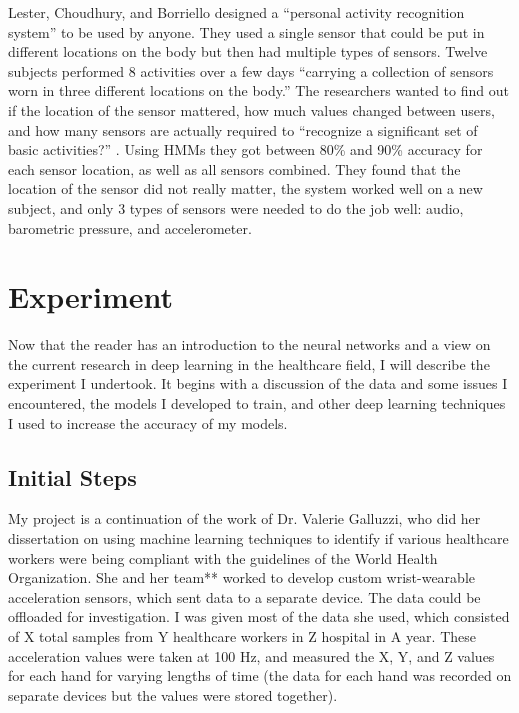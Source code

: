 \documentclass[]{report}
\begin{document}
Lester, Choudhury, and Borriello designed a “personal activity recognition system” to be used by anyone. They used a single sensor that could be put in different locations on the body but then had multiple types of sensors. Twelve subjects performed 8 activities over a few days “carrying a collection of sensors worn in three different locations on the body.” The researchers wanted to find out if the location of the sensor mattered, how much values changed between users, and how many sensors are actually required to “recognize a significant set of basic activities?” \cite{Lester2006}.
Using HMMs they got between 80\% and 90\% accuracy for each sensor location, as well as all sensors combined. They found that the location of the sensor did not really matter, the system worked well on a new subject, and only 3 types of sensors were needed to do the job well: audio, barometric pressure, and accelerometer.


\chapter{Experiment}

Now that the reader has an introduction to the neural networks and a view on the current research in deep learning in the healthcare field, I will describe the experiment I undertook. It begins with a discussion of the data and some issues I encountered, the models I developed to train, and other deep learning techniques I used to increase the accuracy of my models.

\section{Initial Steps}

My project is a continuation of the work of Dr. Valerie Galluzzi, who did her dissertation on using machine learning techniques to identify if various healthcare workers were being compliant with the guidelines of the World Health Organization. She and her team** worked to develop custom wrist-wearable acceleration sensors, which sent data to a separate device. The data could be offloaded for investigation. I was given most of the data she used, which consisted of X total samples from Y healthcare workers in Z hospital in A year. These acceleration values were taken at 100 Hz, and measured the X, Y, and Z values for each hand for varying lengths of time (the data for each hand was recorded on separate devices but the values were stored together). 
\end{document}
